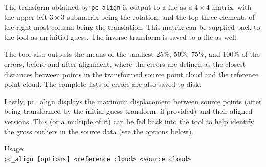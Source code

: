 The transform obtained by \texttt{pc\_align} is output to a file as a
$4\times 4$ matrix, with the upper-left $3\times 3$ submatrix being the
rotation, and the top three elements of the right-most column being the
translation. This matrix can be supplied back to the tool as an initial
guess. The inverse transform is saved to a file as well.

The tool also outputs the means of the smallest 25\%, 50\%, 75\%, and
100\% of the errors, before and after alignment, where the errors are
defined as the closest distances between points in the transformed
source point cloud and the reference point cloud. The complete lists of
errors are also saved to disk.

Lastly, pc\_align displays the maximum displacement between source
points (after being transformed by the initial guess transform, if
provided) and their aligned versions. This (or a multiple of it) can be fed
back into the tool to help identify the gross outliers in the source
data (see the options below).

\medskip

Usage:\\
\hspace*{2em}\texttt{pc\_align [options] <reference cloud> <source cloud>}

\medskip

